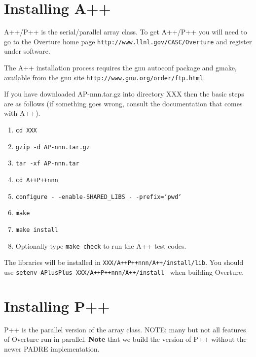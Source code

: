 \documentclass{article}
\begin{document}
\clearpage
\section{Installing A++}

A++/P++ is the serial/parallel array class.
To get A++/P++ you will need to go to the Overture home page \texttt{http://www.llnl.gov/CASC/Overture}
and register under software.

The A++ installation process requires the gnu autoconf package and gmake, available from the
gnu site \texttt{http://www.gnu.org/order/ftp.html}.

If you have downloaded AP-nnn.tar.gz into directory XXX then the basic steps 
are as follows (if something goes wrong, consult the documentation that comes with A++). 
\begin{enumerate}
    \item {\tt cd XXX}
    \item {\tt gzip -d AP-nnn.tar.gz}
    \item {\tt tar -xf AP-nnn.tar}
    \item {\tt cd A++P++nnn}
    \item {\tt configure -\,-enable-SHARED\_LIBS -\,-prefix=`pwd`}
    \item {\tt make} 
    \item {\tt make install}
    \item Optionally type {\tt make check} to run the A++ test codes.
\end{enumerate}
The libraries will be installed in {\tt XXX/A++P++nnn/A++/install/lib}.
You should use {\tt setenv APlusPlus XXX/A++P++nnn/A++/install } when building Overture.

\clearpage
\section{Installing P++}

P++ is the parallel version of the array class. NOTE: many but not all features of Overture run in parallel. 
{\bf Note} that we build the version of P++ without the newer PADRE implementation. 
\end{document}
